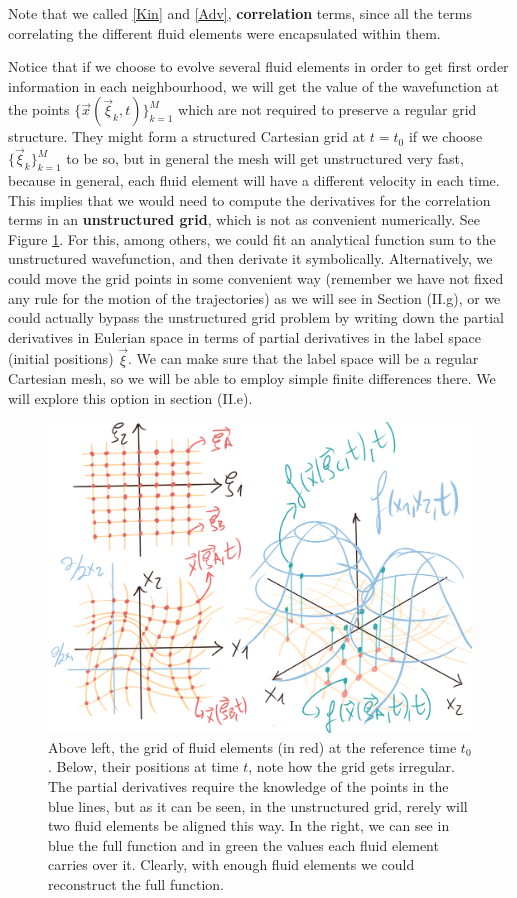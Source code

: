 \documentclass[11pt, a4paper]{article} %
\begin{document}
Note that we called \eqref{Kin} and \eqref{Adv}, {\bf correlation} terms, since all the terms correlating the different fluid elements were encapsulated within them.\vspace{-0.1cm}

Notice that if we choose to evolve several fluid elements in order to get first order information in each neighbourhood, we will get the value of the wavefunction at the points $\{\vec{x}(\vec{\xi}_k,t)\}_{k=1}^M$ which are not required to preserve a regular grid structure. They might form a structured Cartesian grid at $t=t_0$ if we choose $\{\vec{\xi}_k\}_{k=1}^M$ to be so, but in general the mesh will get unstructured very fast, because in general, each fluid element will have a different velocity in each time. This implies that we would need to compute the derivatives for the correlation terms in an {\bf unstructured grid}, which is not as convenient numerically. See Figure \ref{fig:unstructure_fluid}. For this, among others, we could fit an analytical function sum to the unstructured wavefunction, and then derivate it symbolically. Alternatively, we could move the grid points in some convenient way (remember we have not fixed any rule for the motion of the trajectories) as we will see in Section (II.g), or we could actually bypass the unstructured grid problem by writing down the partial derivatives in Eulerian space in terms of partial derivatives in the label space (initial positions) $\vec{\xi}$. We can make sure that the label space will be a regular Cartesian mesh, so we will be able to employ simple finite differences there. We will explore this option in section (II.e). \vspace{0.1cm}
\begin{figure}[h!]
  \centering
    \includegraphics[width=0.65\linewidth]{azkena.png}
  \caption{Above left, the grid of fluid elements (in red) at the reference time $t_0$. Below, their positions at time $t$, note how the grid gets irregular. The partial derivatives require the knowledge of the points in the blue lines, but as it can be seen, in the unstructured grid, rerely will two fluid elements be aligned this way. In the right, we can see in blue the full function and in green the values each fluid element carries over it. Clearly, with enough fluid elements we could reconstruct the full function.   \vspace{-0.3cm}}
  \label{fig:unstructure_fluid}
\end{figure}
\end{document}
